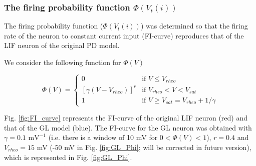 \documentclass[11pt]{scrartcl}
\begin{document}
\subsubsection{The firing probability function \(\Phi(V_t(i))\)}
\label{sec:org07e1b70}

The firing probability function (\(\Phi(V_t(i))\)) was determined so that the firing rate of the neuron to constant current input (FI-curve) reproduces that of the LIF neuron of the original PD model.

We consider the following function for \(\Phi(V)\)

\begin{equation}
\Phi(V) = \begin{cases}
0 & \text{if $V \leq V_{rheo}$}\\
[\gamma(V-V_{rheo})]^r & \text{if $V_{rheo} < V < V_{sat}$} \\
1 & \text{if $V \geq V_{sat} = V_{rheo} + 1/\gamma$}
\end{cases}
\label{eq:phi_full}
\end{equation}


Fig. \ref{fig:FI_curve} represents the FI-curve of the original LIF neuron (red) and that of the GL model (blue). The FI-curve for the GL neuron was obtained with \(\gamma=0.1 \text{ mV}^{-1}\) (i.e. there is a window of 10 mV for \(0 < \Phi(V) < 1\)), \(r=0.4\) and \(V_{rheo}=15\) mV (\color{red}-50 mV in Fig. \ref{fig:GL_Phi}; will be corrected in future version\color{black}), which is represented in Fig. \ref{fig:GL_Phi}.
\end{document}
